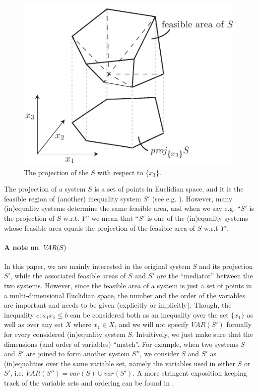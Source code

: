 \begin{figure}
	\centering
		\includegraphics[scale=0.8]{figures/projection.pdf}
	\caption{The projection of the $S$ with respect to $\{x_3\}$.}
	\label{fig:proj}
\end{figure}

The projection of a system $S$ is a set of points in Euclidian space, and it is the feasible region of (another) inequality system $S'$ (see e.g. \cite{ziegler95}). However, many (in)equality systems determine the same feasible area, and when we say e.g. ``$S'$ is the projection of $S$ w.r.t. $Y$'' we mean that ``$S'$ is one of the (in)equality systems whose feasible area equals the projection of the feasible area of $S$ w.r.t $Y$''.

\paragraph{A note on $\mathit{VAR}(S)$}
In this paper, we are mainly interested in the original system $S$ and its projection $S'$, while the associated feasible areas of $S$ and $S'$ are the ``mediator'' between the two systems. 
However, since the feasible area of a system is just a set of points in a multi-dimensional Euclidian space, the number and the order of the variables are important and needs to be given (explicitly or implicitly). 
%
Though, the inequality $c:a_1x_1\leq b$ can be considered both as an inequality over the set $\{x_1\}$ as well as over any set $X$ where $x_1\in X$, and we will not specify $VAR(S')$ formally for every considered (in)equality system $S$.
Intuitively, we just make sure that the dimensions (and order of variables) ``match''. For example, when two systems $S$ and $S'$ are joined to form another system $S''$, we consider $S$ and $S'$ as (in)equalities over the same variable set, namely the variables used in either $S$ or $S'$, i.e. $VAR(S'')=var(S)\cup var(S')$.
A more stringent exposition keeping track of the variable sets and ordering can be found in \cite{MyTechRep}.
%

